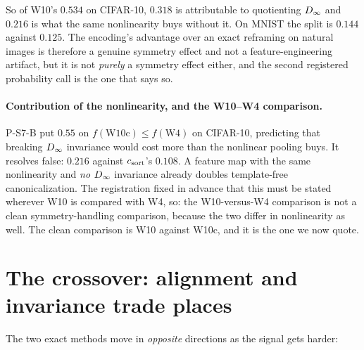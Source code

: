 So of W10's $0.534$ on CIFAR-10, $0.318$ is attributable to quotienting $D_\infty$ and $0.216$ is
what the same nonlinearity buys without it. On MNIST the split is $0.144$ against $0.125$. The
encoding's advantage over an exact reframing on natural images is therefore a genuine symmetry
effect and not a feature-engineering artifact, but it is not \emph{purely} a symmetry effect
either, and the second registered probability call is the one that says so.

\paragraph{Contribution of the nonlinearity, and the W10--W4 comparison.}
P-S7-B put $0.55$ on $f(\mathrm{W10c}) \le f(\mathrm{W4})$ on CIFAR-10, predicting that breaking $D_\infty$ invariance would cost more than the nonlinear pooling buys. It resolves false: $0.216$ against
$c_{\mathrm{sort}}$'s $0.108$. A feature map with the same nonlinearity and \emph{no} $D_\infty$ invariance
already doubles template-free canonicalization. The registration fixed in advance that this must be
stated wherever W10 is compared with W4, so: the W10-versus-W4 comparison is not a clean
symmetry-handling comparison, because the two differ in nonlinearity as well. The clean comparison
is W10 against W10c, and it is the one we now quote.


\section{The crossover: alignment and invariance trade places}\label{app:crossover}\label{sec:crossover}

The two exact methods move in \emph{opposite} directions as the signal gets harder:
\begin{center}\small
{}
\end{center}

